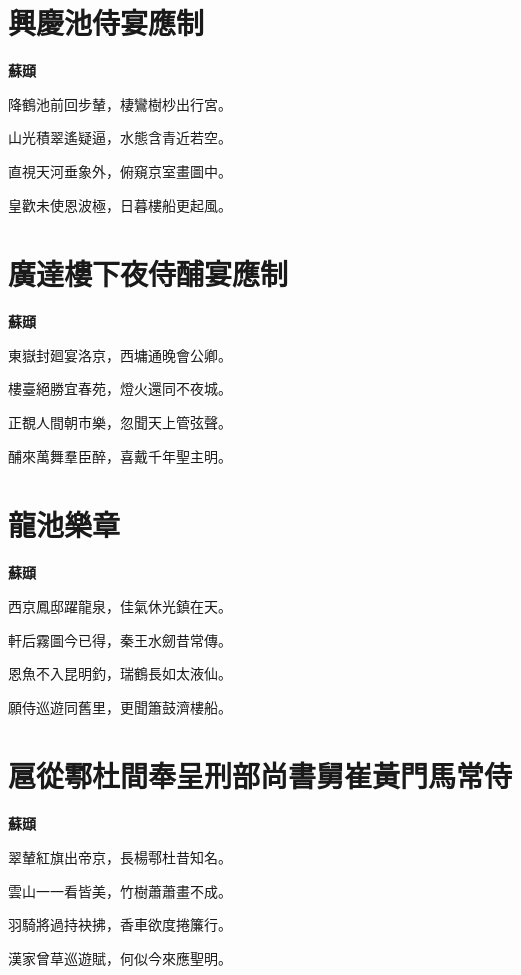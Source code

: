 \documentclass[12pt,a4paper]{ctexbook}
\begin{document}
\section{興慶池侍宴應制}
\textbf{蘇頲}\par\vspace{0.5em}
降鶴池前回步輦，棲鸞樹杪出行宮。\par
山光積翠遙疑逼，水態含青近若空。\par
直視天河垂象外，俯窺京室畫圖中。\par
皇歡未使恩波極，日暮樓船更起風。\par

\section{廣達樓下夜侍酺宴應制}
\textbf{蘇頲}\par\vspace{0.5em}
東嶽封廻宴洛京，西墉通晚會公卿。\par
樓臺絕勝宜春苑，燈火還同不夜城。\par
正覩人間朝市樂，忽聞天上管弦聲。\par
酺來萬舞羣臣醉，喜戴千年聖主明。\par

\section{龍池樂章}
\textbf{蘇頲}\par\vspace{0.5em}
西京鳳邸躍龍泉，佳氣休光鎮在天。\par
軒后霧圖今已得，秦王水劒昔常傳。\par
恩魚不入昆明釣，瑞鶴長如太液仙。\par
願侍巡遊同舊里，更聞簫鼓濟樓船。\par

\section{扈從鄠杜間奉呈刑部尚書舅崔黃門馬常侍}
\textbf{蘇頲}\par\vspace{0.5em}
翠輦紅旗出帝京，長楊鄠杜昔知名。\par
雲山一一看皆美，竹樹蕭蕭畫不成。\par
羽騎將過持袂拂，香車欲度捲簾行。\par
漢家曾草巡遊賦，何似今來應聖明。\par
\end{document}
